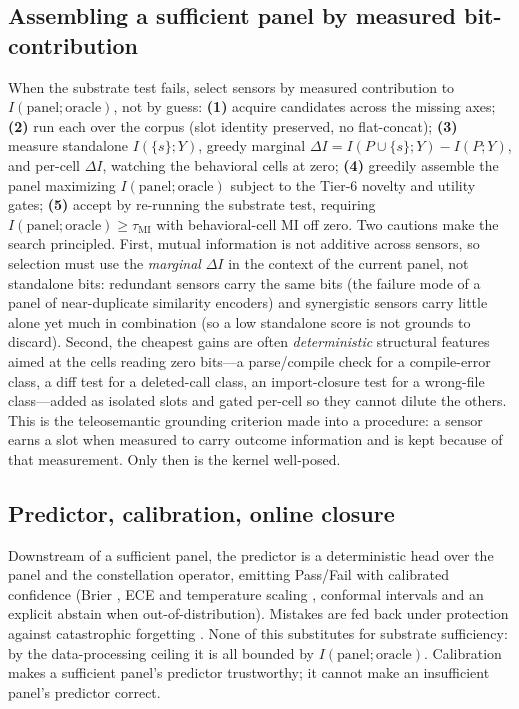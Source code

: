 \documentclass[10pt,twocolumn]{article}
\begin{document}
\subsection{Assembling a sufficient panel by measured bit-contribution}
\label{sec:assembly}
When the substrate test fails, select sensors by measured contribution to
$I(\text{panel};\text{oracle})$, not by guess: \textbf{(1)} acquire candidates
across the missing axes; \textbf{(2)} run each over the corpus (slot identity
preserved, no flat-concat); \textbf{(3)} measure standalone $I(\{s\};Y)$, greedy
marginal $\Delta I=I(P\cup\{s\};Y)-I(P;Y)$, and per-cell $\Delta I$, watching the
behavioral cells at zero; \textbf{(4)} greedily assemble the panel maximizing
$I(\text{panel};\text{oracle})$ subject to the Tier-6 novelty and utility gates;
\textbf{(5)} accept by re-running the substrate test, requiring
$I(\text{panel};\text{oracle})\ge\tau_{\mathrm{MI}}$ with behavioral-cell MI off
zero. Two cautions make the search principled. First, mutual information is not
additive across sensors, so selection must use the \emph{marginal} $\Delta I$ in
the context of the current panel, not standalone bits: redundant sensors carry the
same bits (the failure mode of a panel of near-duplicate similarity encoders) and
synergistic sensors carry little alone yet much in combination (so a low standalone
score is not grounds to discard). Second, the cheapest gains are often
\emph{deterministic} structural features aimed at the cells reading zero bits---a
parse/compile check for a compile-error class, a diff test for a deleted-call
class, an import-closure test for a wrong-file class---added as isolated slots and
gated per-cell so they cannot dilute the others. This is the teleosemantic
grounding criterion \citep{mollo2023vector} made into a procedure: a sensor earns
a slot when measured to carry outcome information and is kept because of that
measurement. Only then is the kernel well-posed.

\subsection{Predictor, calibration, online closure}
Downstream of a sufficient panel, the predictor is a deterministic head over the
panel and the constellation operator, emitting \textsf{Pass}/\textsf{Fail} with
calibrated confidence (Brier \citep{brier1950verification}, ECE and temperature
scaling \citep{guo2017calibration}, conformal intervals
\citep{angelopoulos2021gentle} and an explicit abstain when out-of-distribution).
Mistakes are fed back under protection against catastrophic forgetting
\citep{kirkpatrick2017overcoming}. None of this substitutes for substrate
sufficiency: by the data-processing ceiling it is all bounded by
$I(\text{panel};\text{oracle})$. Calibration makes a sufficient panel's predictor
trustworthy; it cannot make an insufficient panel's predictor correct.
\end{document}

